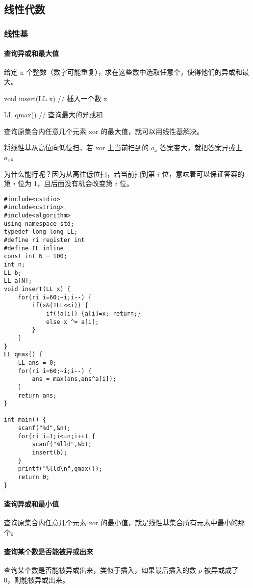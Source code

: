\documentclass[UTF8]{ctexart}
\begin{document}
\subsection{线性代数}
\subsubsection{线性基}
\paragraph{查询异或和最大值}
给定 n 个整数（数字可能重复），求在这些数中选取任意个，使得他们的异或和最大。

void insert(LL x)                       // 插入一个数 x

LL qmax()                                 // 查询最大的异或和

查询原集合内任意几个元素 xor 的最大值，就可以用线性基解决。

将线性基从高位向低位扫，若 xor 上当前扫到的 $a_x$ 答案变大，就把答案异或上 $a_x$。

为什么能行呢？因为从高往低位扫，若当前扫到第 $i$ 位，意味着可以保证答案的第 $i$ 位为 1，且后面没有机会改变第 $i$ 位。

\begin{framed}
\begin{lstlisting}
#include<cstdio>
#include<cstring>
#include<algorithm>
using namespace std;
typedef long long LL;
#define ri register int 
#define IL inline
const int N = 100;
int n;
LL b;
LL a[N];
void insert(LL x) {
    for(ri i=60;~i;i--) {
        if(x&(1LL<<i)) {
            if(!a[i]) {a[i]=x; return;}
            else x ^= a[i];
        }
    }
}
LL qmax() {
    LL ans = 0;
    for(ri i=60;~i;i--) {
        ans = max(ans,ans^a[i]);
    }
    return ans;
}

int main() {
    scanf("%d",&n);
    for(ri i=1;i<=n;i++) {
        scanf("%lld",&b);
        insert(b);
    }
    printf("%lld\n",qmax());
    return 0;
}
\end{lstlisting}
\end{framed}

\paragraph{查询异或和最小值}
查询原集合内任意几个元素 xor 的最小值，就是线性基集合所有元素中最小的那个。

\paragraph{查询某个数是否能被异或出来}
查询某个数是否能被异或出来，类似于插入，如果最后插入的数 $p$ 被异或成了 0，则能被异或出来。
\end{document}
